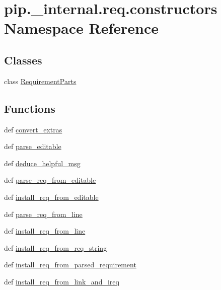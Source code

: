 \hypertarget{namespacepip_1_1__internal_1_1req_1_1constructors}{}\section{pip.\+\_\+internal.\+req.\+constructors Namespace Reference}
\label{namespacepip_1_1__internal_1_1req_1_1constructors}
\subsection*{Classes}
\begin{DoxyCompactItemize}
\item 
class \hyperlink{classpip_1_1__internal_1_1req_1_1constructors_1_1RequirementParts}{Requirement\+Parts}
\end{DoxyCompactItemize}
\subsection*{Functions}
\begin{DoxyCompactItemize}
\item 
def \hyperlink{namespacepip_1_1__internal_1_1req_1_1constructors_a5108be7488d43adcb3f503889f4fb408}{convert\+\_\+extras}
\item 
def \hyperlink{namespacepip_1_1__internal_1_1req_1_1constructors_af93616282ee31edaf44f8e1bae5cdfd6}{parse\+\_\+editable}
\item 
def \hyperlink{namespacepip_1_1__internal_1_1req_1_1constructors_a4613ab05443f6497b7f1319ed7a38a36}{deduce\+\_\+helpful\+\_\+msg}
\item 
def \hyperlink{namespacepip_1_1__internal_1_1req_1_1constructors_a24eef9afab1d7c3cd8d62f70cb7578d6}{parse\+\_\+req\+\_\+from\+\_\+editable}
\item 
def \hyperlink{namespacepip_1_1__internal_1_1req_1_1constructors_a8714c4349479bab7f7e0f6ac4519da59}{install\+\_\+req\+\_\+from\+\_\+editable}
\item 
def \hyperlink{namespacepip_1_1__internal_1_1req_1_1constructors_ab692d24649d0caae52bc3014fb6c510b}{parse\+\_\+req\+\_\+from\+\_\+line}
\item 
def \hyperlink{namespacepip_1_1__internal_1_1req_1_1constructors_aecf104e520e07677279c842aae3dbe61}{install\+\_\+req\+\_\+from\+\_\+line}
\item 
def \hyperlink{namespacepip_1_1__internal_1_1req_1_1constructors_a7f068e3d662c7c54d73f10f8539ae3aa}{install\+\_\+req\+\_\+from\+\_\+req\+\_\+string}
\item 
def \hyperlink{namespacepip_1_1__internal_1_1req_1_1constructors_afd9e5cf6b3fea6b24d8d884ae41f16c7}{install\+\_\+req\+\_\+from\+\_\+parsed\+\_\+requirement}
\item 
def \hyperlink{namespacepip_1_1__internal_1_1req_1_1constructors_a78b90a5d9750def943a952f6dd631147}{install\+\_\+req\+\_\+from\+\_\+link\+\_\+and\+\_\+ireq}
\end{DoxyCompactItemize}
